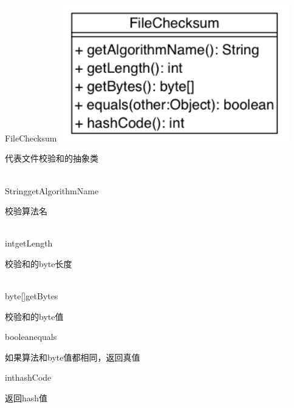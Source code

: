 \begin{XeClass}{FileChecksum}
\includegraphics[width=10cm]{cdig/FileChecksum.png}
     
 代表文件校验和的抽象类

    \begin{XeMethod}{\XePublic \\ \XeAbstract}{String}{getAlgorithmName}
         
 校验算法名 

    \end{XeMethod}

    \begin{XeMethod}{\XePublic \\ \XeAbstract}{int}{getLength}
         
 校验和的byte长度 

    \end{XeMethod}

    \begin{XeMethod}{\XePublic \\ \XeAbstract}{byte[]}{getBytes}
         
 校验和的byte值

    \end{XeMethod}

    \begin{XeMethod}{\XePublic}{boolean}{equals}
         
 如果算法和byte值都相同，返回真值

    \end{XeMethod}

    \begin{XeMethod}{\XePublic}{int}{hashCode}
         
 返回hash值

    \end{XeMethod}

\end{XeClass}

